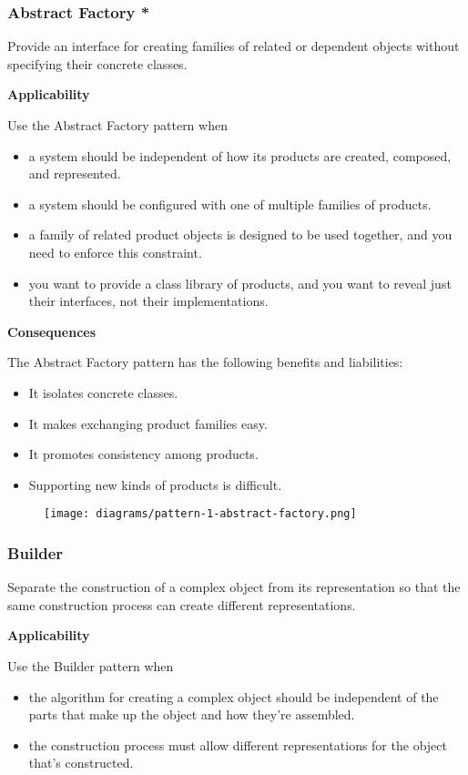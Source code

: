 \documentclass{article}
\begin{document}
\subsubsection{Abstract Factory *}
Provide an interface for creating families of related or dependent objects without specifying their concrete classes.

\textbf{Applicability}

Use the Abstract Factory pattern when
\begin{itemize}
    \item a system should be independent of how its products are created, composed, and represented.
    \item a system should be configured with one of multiple families of products.
    \item a family of related product objects is designed to be used together, and you need to enforce this constraint.
    \item you want to provide a class library of products, and you want to reveal just their interfaces, not their implementations.
\end{itemize}

\textbf{Consequences}

The Abstract Factory pattern has the following benefits and liabilities:
\begin{itemize}
    \item It isolates concrete classes.
    \item It makes exchanging product families easy.
    \item It promotes consistency among products.
    \item Supporting new kinds of products is difficult.
\end{itemize}

\begin{figure}[h]
    \centering
    \texttt{[image: diagrams/pattern-1-abstract-factory.png]}
\end{figure}

\newpage
\subsubsection{Builder}
Separate the construction of a complex object from its representation so
that the same construction process can create different representations.


\textbf{Applicability}

Use the Builder pattern when
\begin{itemize}
    \item the algorithm for creating a complex object should be independent of the parts that make up the object and how they're assembled.
    \item the construction process must allow different representations for the object that's constructed.
\end{itemize}
\end{document}
